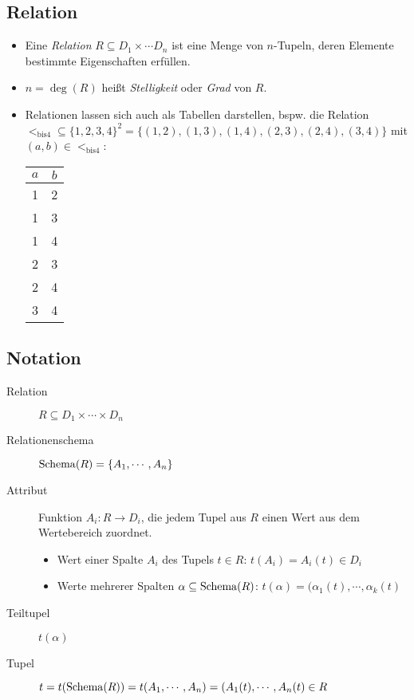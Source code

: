         \subsection{Relation} %
            \begin{itemize}
            	\item Eine \textit{Relation} \( R \subseteq D _ 1 \times \cdots D _ n \) ist eine Menge von \(n\)-Tupeln, deren Elemente bestimmte Eigenschaften erfüllen.
            	\item \( n = \deg(R) \) heißt \textit{Stelligkeit} oder \textit{Grad} von \(R\).
            	\item Relationen lassen sich auch als Tabellen darstellen, bspw. die Relation \( < _ \text{bis4} \subseteq \{ 1, 2, 3, 4 \} ^ 2 = \{ (1, 2), (1, 3), (1, 4), (2, 3), (2, 4), (3, 4) \} \) mit \( (a, b) \in < _ \text{bis4} \):
            		\begin{table}[H]
            			\centering
            			\begin{tabular}{c | c}
            				\(a\) & \(b\) \\ \hline
            				  1   & 2     \\
            				  1   & 3     \\
            				  1   & 4     \\
            				  2   & 3     \\
            				  2   & 4     \\
            				  3   & 4
            			\end{tabular}
            		\end{table}
            \end{itemize}

        \subsection{Notation} %
            \begin{description}
            	\item[Relation] \( R \subseteq D _ 1 \times \cdots \times D _ n \)
            	\item[Relationenschema] \( \operatorname{Schema}(R) = \{ A _ 1, \cdots, A _ n \} \)
            	\item[Attribut] Funktion \( A _ i : R \rightarrow D _ i \), die jedem Tupel aus \(R\) einen Wert aus dem Wertebereich zuordnet.
            		\begin{itemize}
            			\item Wert einer Spalte \(A_i\) des Tupels \( t \in R \): \( t(A_i) = A_i(t) \in D_i \)
            			\item Werte mehrerer Spalten \( \alpha \subseteq \operatorname{Schema}(R) \): \( t(\alpha) = (\alpha_1(t), \cdots, \alpha_k(t) \)
            		\end{itemize}
            	\item[Teiltupel] \(t(\alpha)\)
            	\item[Tupel] \( t = t(\operatorname{Schema}(R)) = t(A_1, \cdots, A_n) = (A_1(t), \cdots, A_n(t) \in R \)
            \end{description}


